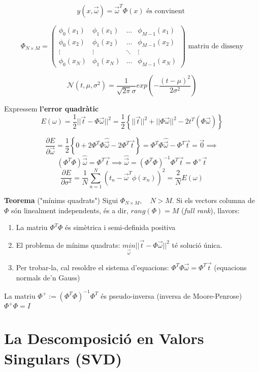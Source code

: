 \documentclass[a4paper]{article}
\begin{document}
$$
\boxed{y(x, \vec{\omega}) = \vec{\omega}^T \Phi(x)} \text{ és convinent }
$$

$$
\Phi_{N \times M} =
\begin{pmatrix}
\phi_0 (x_1) & \phi_1(x_1) & \ldots & \phi_{M-1} (x_1) \\
\phi_0 (x_2) & \phi_1(x_2) & \ldots & \phi_{M-1} (x_2) \\
\vdots & \vdots & \ddots & \vdots \\
\phi_0 (x_N) & \phi_1(x_N) & \ldots & \phi_{M-1} (x_N)
\end{pmatrix}
\text{ matriu de disseny}
$$

$$
\mathcal{N}(t, \mu, \sigma^2) = \frac{1}{\sqrt{2 \pi} \sigma} exp \left( - \frac{(t - \mu)^2}{2\sigma^2} \right)
$$

Expressem \textbf{l'error quadràtic}
$$
E(\omega) = \frac{1}{2} || \vec{t} - \Phi \vec{\omega} ||^2 = \frac{1}{2} \left\{ ||\vec{t}||^2 + ||\Phi \vec{\omega}||^2 - 2t^T(\Phi \vec{\omega}) \right\}
$$

$$
\frac{\partial E}{\partial \vec{\omega}} = \frac{1}{2} \left\{ 0 + 2 \Phi^T \Phi \hat{\vec{\omega}} - 2 \Phi^T \vec{t} \right\} = \Phi^T \Phi \hat{\vec{\omega}} - \Phi^T \vec{t} = \vec{0} \implies
$$
$$
\left( \Phi^T \Phi \right) \hat{\vec{\omega}} = \Phi^T \vec{t} \implies
\boxed{\hat{\vec{\omega}} = (\Phi^T \Phi)^{-1} \Phi^T \vec{t}} = \Phi^+ \vec{t}
$$
$$
\frac{\partial E}{\partial \sigma^2} = \frac{1}{N} \sum_{n=1}^N (t_n - \vec{\omega}^T \phi(x_n))^2 = \frac{2}{N} E(\omega)
$$

\textbf{Teorema} ("mínims quadrats")
Sigui $\Phi_{N\times M}, \quad N > M$. Si els vectors columna de $\Phi$ són linealment independents, és a dir, $rang(\Phi) = M$ (\emph{full rank}), llavors:

\begin{enumerate}
	\item La matriu $\Phi^T\Phi$ és simètrica i semi-definida positiva
	\item El problema de mínims quadrats: 
	$\underset{\vec{\omega}}{min} ||\vec{t} - \Phi \vec{\omega}||^2$ té solució única.
	\item Per trobar-la, cal resoldre el sistema d'equacions: $\Phi^T\Phi \vec{\omega} = \Phi^T \vec{t}$ (equacions normals de'n Gauss)
\end{enumerate}

La matriu $ \Phi^+ := \left( \Phi^T \Phi \right)^{-1} \Phi^T $ és pseudo-inversa (inversa de Moore-Penrose) $ \Phi^+ \Phi = I $

\section{La Descomposició en Valors Singulars (SVD)}
\end{document}
